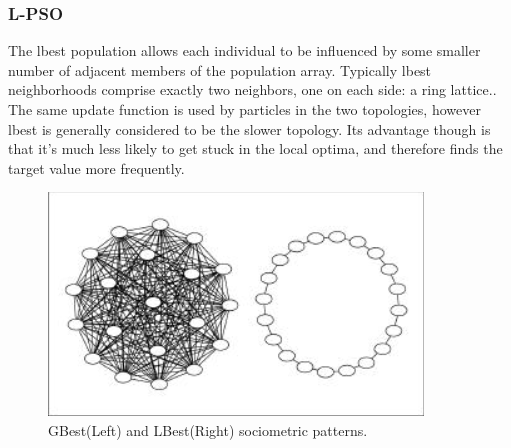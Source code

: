 \documentclass[oneside,12pt]{book}
\begin{document}
\subsubsection{L-PSO}
The  lbest  population  allows  each  individual  to  be  influenced  by  some  smaller  number  of  adjacent  members  of the  population  array. Typically  lbest  neighborhoods comprise exactly two neighbors, one on each side: a ring lattice.\cite{kennedy2002population}. The same update function is used by particles in the two topologies, however lbest is generally considered to be the slower topology. Its advantage though is that it's much less likely to get stuck in the local optima, and therefore finds the target value more frequently. 

\begin{figure}[H]
    \centering
    \includegraphics[scale=1.0]{Images/NeighborhoodTopology.png}
    \caption{GBest(Left) and LBest(Right) sociometric patterns. \cite{kennedy2002population} }
    \label{fig:GBest(Left) and LBest(Right) sociometric patterns.}
\end{figure}
\end{document}
